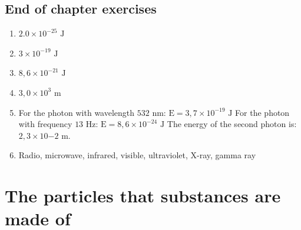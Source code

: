 \subsection{End of chapter exercises} 
\begin{multicols}{2}
\begin{enumerate}[itemsep=20pt, label=\textbf{\arabic*}.]
\item $2.0 \times 10^{-25} \text{ J}$
\item $3 \times 10^{-19} \text{ J}$
\item $8,6 \times 10^{-21} \text{ J}$
\item $3,0 \times 10^{3} \text{ m}$
\item For the photon with wavelength $532 \text{ nm}$: $\text{E}=3,7 \times 10^{-19} \text{ J}$ \newline
For the photon with frequency $13 \text{ Hz}$: $\text{E}=8,6 \times 10^{-24} \text{ J}$ \newline
The energy of the second photon is: $2,3 \times 10{-2} \text{ m}$.
\item Radio, microwave, infrared, visible, ultraviolet, X-ray, gamma ray
\end{enumerate}
\end{multicols}

\section{The particles that substances are made of}
